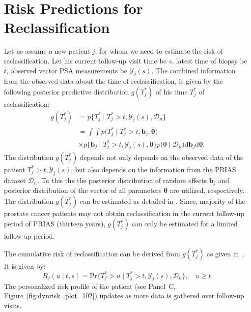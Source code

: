 \section{Risk Predictions for Reclassification}
\label{sec:param_estimates_jm_fit_prias}
Let us assume a new patient $j$, for whom we need to estimate the risk of reclassification. Let his current follow-up visit time be $s$, latest time of biopsy be $t$, observed vector PSA measurements be $\mathcal{Y}_{j}(s)$. The combined information from the observed data about the time of reclassification, is given by the following posterior predictive distribution $g(T^*_j)$ of his time $T^*_j$ of reclassification:
\begin{equation*}
\label{eq:post_pred_dist}
\begin{aligned}
g(T^*_j) &= p\big\{T^*_j \mid T^*_j > t, \mathcal{Y}_{j}(s), \mathcal{D}_n\big\}\\
&= \int \int p\big(T^*_j \mid T^*_j > t, \boldsymbol{b}_j, \boldsymbol{\theta}\big)\\
&\times p\big\{\boldsymbol{b}_j \mid T^*_j>t, \mathcal{Y}_{j}(s), \boldsymbol{\theta}\big\}p\big(\boldsymbol{\theta} \mid \mathcal{D}_n\big) \mathrm{d} \boldsymbol{b}_j \mathrm{d} \boldsymbol{\theta}.
\end{aligned}
\end{equation*}
The distribution $g(T^*_j)$ depends not only depends on the observed data of the patient $T^*_j > t, \mathcal{Y}_{j}(s)$, but also depends on the information from the PRIAS dataset $\mathcal{D}_n$. To this the the posterior distribution of random effects $\boldsymbol{b}_j$ and posterior distribution of the vector of all parameters $\boldsymbol{\theta}$ are utilized, respectively. The distribution $g(T^*_j)$ can be estimated as detailed in \citet{rizopoulos2017dynamic}. Since, majority of the prostate cancer patients may not obtain reclassification in the current follow-up period of PRIAS (thirteen years), $g(T^*_j)$ can only be estimated for a limited follow-up period.

The cumulative risk of reclassification can be derived from $g(T^*_j)$ as given in~\citep{rizopoulos2017dynamic}. It is given by:
\begin{equation}
\label{eq:dynamic_risk_prob}
R_j(u \mid t,s) = \mbox{Pr}\big\{T^*_j > u \mid T^*_j > t, \mathcal{Y}_{j}(s), \mathcal{D}_n\big\}, \quad u \geq t.
\end{equation}
The personalized risk profile of the patient (see Panel~C, Figure~\ref{fig:dynrisk_plot_102}) updates as more data is gathered over follow-up visits. 

